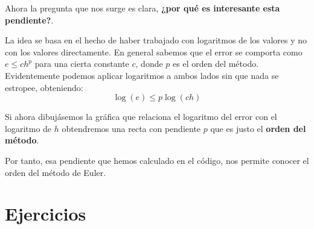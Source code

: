 \documentclass{apuntes}
\begin{document}
Ahora la pregunta que nos surge es clara, \textbf{¿por qué es interesante esta pendiente?}.

La idea se basa en el hecho de haber trabajado con logaritmos de los valores y no con los valores directamente. En general sabemos que el error se comporta como $e \leq c h^p$ para una cierta constante $c$, donde $p$ es el orden del método. Evidentemente podemos aplicar logaritmos a ambos lados sin que nada se estropee, obteniendo:
\[\log(e) \leq p \log(ch)\]

Si ahora dibujásemos la gráfica que relaciona el logaritmo del error con el logaritmo de $h$ obtendremos una recta con pendiente $p$ que es justo el \textbf{orden del método}.

Por tanto, esa pendiente que hemos calculado en el código, nos permite conocer el orden del método de Euler.




\appendix

\chapter{Ejercicios}

\printindex
\end{document}
